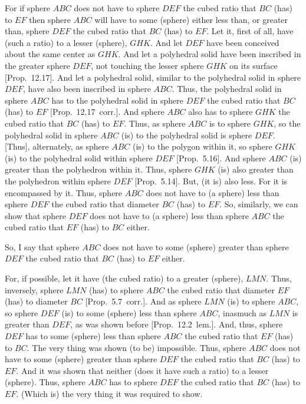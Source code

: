 For if sphere $ABC$ does not have to sphere $DEF$ the cubed ratio that $BC$ (has) to $EF$ then  sphere $ABC$ will have
to some (sphere) either less than, or greater than, sphere $DEF$ the cubed ratio that $BC$ (has) to $EF$.
Let it, first of all, have (such a ratio) to a lesser (sphere), $GHK$. And let $DEF$ have been conceived about the same
center as $GHK$. And let a polyhedral solid have been inscribed in the greater sphere $DEF$, not touching the lesser
sphere $GHK$ on its surface [Prop.~12.17]. And let a polyhedral solid, similar to the polyhedral
solid in sphere $DEF$, have also been inscribed in sphere $ABC$. Thus, the polyhedral solid in sphere $ABC$ has to
the polyhedral solid in sphere $DEF$ the cubed ratio that $BC$ (has) to $EF$ [Prop.~12.17~corr.].
And sphere $ABC$ also has to sphere $GHK$ the cubed ratio that $BC$ (has) to $EF$.  Thus, as sphere $ABC$
is to sphere $GHK$, so the polyhedral solid in sphere $ABC$ (is) to the polyhedral solid is sphere
$DEF$. [Thus], alternately, as sphere $ABC$ (is) to the polygon within it, so sphere $GHK$ (is) to the polyhedral
solid within sphere $DEF$ [Prop.~5.16]. And sphere $ABC$ (is) greater than the polyhedron
within it. Thus, sphere $GHK$ (is) also greater than the polyhedron within sphere $DEF$ [Prop.~5.14]. But, (it is) also less. For it is encompassed by it. Thus, sphere $ABC$ does not have to (a sphere) less than sphere
$DEF$ the  cubed ratio that diameter $BC$ (has) to $EF$. So, similarly, we can show that sphere
$DEF$ does not have to  (a sphere) less than sphere $ABC$ the cubed ratio 
that $EF$ (has) to $BC$ either.

So, I say that sphere $ABC$ does not have to some (sphere) greater than sphere $DEF$ the cubed ratio that
$BC$ (has) to $EF$ either.

For, if possible, let it have (the cubed ratio) to a greater (sphere), $LMN$. Thus, inversely, sphere $LMN$
(has) to sphere $ABC$ the cubed ratio that diameter $EF$ (has) to diameter $BC$ [Prop.~5.7~corr.].
And as sphere $LMN$ (is) to sphere $ABC$, so sphere $DEF$ (is) to some (sphere) less than sphere $ABC$, inasmuch
as  $LMN$ is greater than $DEF$, as was shown before [Prop.~12.2~lem.]. And, thus, sphere
$DEF$ has to some (sphere) less than sphere $ABC$ the cubed ratio that $EF$ (has) to $BC$. The very thing
was shown (to be) impossible. Thus, sphere $ABC$ does not have to some (sphere) greater than sphere $DEF$
the cubed ratio that $BC$ (has) to $EF$. And it was shown that neither (does it have such a ratio) to a lesser
(sphere). Thus, sphere $ABC$ has to sphere $DEF$ the cubed ratio that $BC$ (has) to $EF$. (Which is)
the very thing it was required to show.